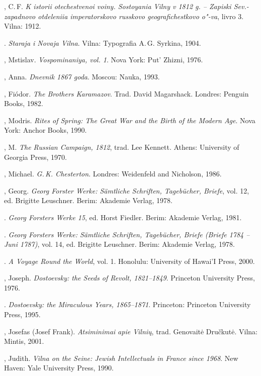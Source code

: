 \begin{bibliohedra}
  , C.\,F. \textit{K istorii otechestvenoi voiny. Sostoyania
  Vilny v 1812 g. -- Zapiski Sev.-zapadnovo otdeleniia imperatorskovo
  russkovo geografichestkovo o"-va}, livro 3. Vilna: 1912.

  \titidem. \textit{Staraja i Novaja Vilna}. Vilna: Typografia A.\,G.
  Syrkina, 1904.

  , Mstislav. \textit{Vospominaniya, vol. 1}. Nova York: Put'
  Zhizni, 1976.

  , Anna. \textit{Dnevnik 1867 goda}.
  Moscou: Nauka, 1993.

  , Fiódor. \textit{The Brothers Karamazov}. Trad. David
  Magarshack. Londres: Penguin Books, 1982.

  , Modris. \textit{Rites of Spring: The Great War and the Birth
  of the Modern Age}. Nova York: Anchor Books, 1990.

  , M. \textit{The Russian Campaign, 1812}, trad. Lee Kennett.
  Athens: University of Georgia Press, 1970.

  , Michael. \textit{G.\,K. Chesterton}. Londres: Weidenfeld and
  Nicholson, 1986.

  , Georg. \textit{Georg Forster Werke: Sämtliche Schriften,
  Tagebücher, Briefe}, vol. 12, ed. Brigitte Leuschner. Berim: Akademie
  Verlag, 1978.

  \titidem. \textit{Georg Forsters Werke 15}, ed. Horst Fiedler.
  Berim: Akademie Verlag, 1981.

  \titidem. \textit{Georg Forsters Werke: Sämtliche Schriften,
  Tagebücher, Briefe (Briefe 1784 -- Juni 1787)}, vol. 14, ed. Brigitte
  Leuschner. Berim: Akademie Verlag, 1978.

  \titidem. \textit{A Voyage Round the World}, vol. 1. Honolulu:
  University of Hawai'I Press, 2000.

  , Joseph. \textit{Dostoevsky: the Seeds of Revolt, 1821--1849}.
  Princeton University Press, 1976.

  \titidem. \textit{Dostoevsky: the Miraculous Years, 1865--1871}.
  Princeton: Princeton University Press, 1995.

  , Josefas (Josef Frank). \textit{Atsiminimai apie Vilnių}, trad.
  Genovaitė Dručkutė. Vilna: Mintis, 2001.

  , Judith. \textit{Vilna on the Seine: Jewish Intellectuals in
  France since 1968}. New Haven: Yale University Press, 1990.


\end{bibliohedra}
